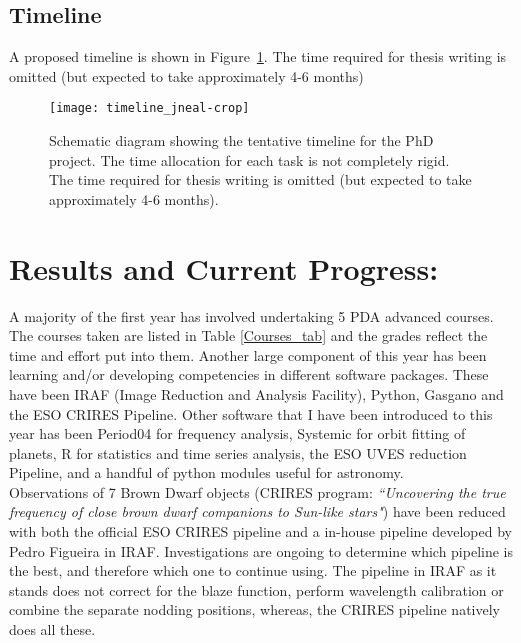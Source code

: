 \documentclass[pdftex,12pt,a4paper]{article}
\begin{document}
\subsection*{Timeline}
A proposed timeline is shown in Figure~\ref{timeline_fig}. The time
required for thesis writing is omitted (but expected to take approximately 4-6 months)

\begin{landscape}
\begin{figure}
\texttt{[image: timeline\_jneal-crop]}
\caption{Schematic diagram showing the tentative timeline for the PhD project. The time allocation for each task is not completely rigid. The time required for thesis writing is omitted (but expected to take approximately 4-6 months).
\label{timeline_fig}}
\end{figure}
\end{landscape}

\newpage
\section{Results and Current Progress:}
\label{current_progress}
A majority of the first year has involved undertaking 5 PDA advanced courses. The courses taken are listed in Table \ref{Courses_tab} and the grades reflect the time and effort put into them. Another large component of this year has been learning and/or developing competencies in different software packages. These have been IRAF (Image Reduction and Analysis Facility), Python, Gasgano and the ESO CRIRES Pipeline.
Other software that I have been introduced to this year has been Period04 for frequency analysis, Systemic for orbit fitting of planets, R for statistics and time series analysis, the ESO UVES reduction Pipeline, and a handful of python modules useful for astronomy.\\

Observations of 7 Brown Dwarf objects (CRIRES program: \textit{``Uncovering the true frequency of close brown dwarf companions to Sun-like stars"}) have been reduced with both the official ESO CRIRES pipeline and a in-house pipeline developed by Pedro Figueira in IRAF. Investigations are ongoing to determine which pipeline is the best, and therefore which one to continue using. The pipeline in IRAF as it stands does not correct for the blaze function, perform wavelength calibration or combine the separate nodding positions, whereas, the CRIRES pipeline natively does all these.\\
\end{document}
